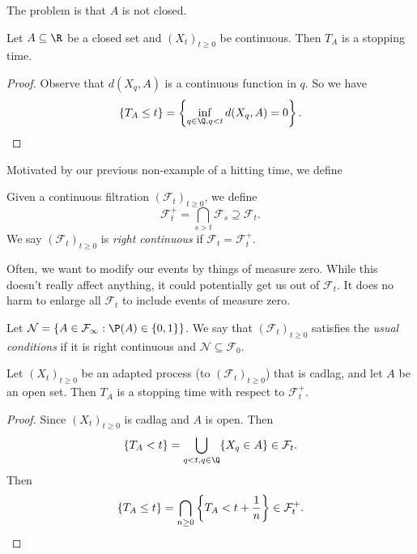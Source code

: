 \documentclass[a4paper]{article}
\begin{document}
The problem is that $A$ is not closed.

\begin{prop}
  Let $A \subseteq \R$ be a closed set and $(X_t)_{t \geq 0}$ be continuous. Then $T_A$ is a stopping time.
\end{prop}

\begin{proof}
  Observe that $d(X_q, A)$ is a continuous function in $q$. So we have
  \[
    \{T_A \leq t\} = \left\{\inf_{q \in \Q, q < t} d(X_q, A) = 0\right\}.\qedhere
  \]
\end{proof}

Motivated by our previous non-example of a hitting time, we define
\begin{defi}
  Given a continuous filtration $(\mathcal{F}_t)_{t \geq 0}$, we define
  \[
    \mathcal{F}_t^+ = \bigcap_{s > t} \mathcal{F}_s \supseteq \mathcal{F}_t.
  \]
  We say $(\mathcal{F}_t)_{t \geq 0}$ is \emph{right continuous} if $\mathcal{F}_t = \mathcal{F}_t^+$.
\end{defi}

Often, we want to modify our events by things of measure zero. While this doesn't really affect anything, it could potentially get us out of $\mathcal{F}_t$. It does no harm to enlarge all $\mathcal{F}_t$ to include events of measure zero.

\begin{defi}
  Let $\mathcal{N} = \{A \in \mathcal{F}_\infty : \P(A) \in \{0, 1\}\}$. We say that $(\mathcal{F}_t)_{t \geq 0}$ satisfies the \emph{usual conditions} if it is right continuous and $\mathcal{N} \subseteq \mathcal{F}_0$.
\end{defi}

\begin{prop}
  Let $(X_t)_{t \geq 0}$ be an adapted process (to $(\mathcal{F}_{t})_{t \geq 0}$) that is cadlag, and let $A$ be an open set. Then $T_A$ is a stopping time with respect to $\mathcal{F}_t^+$.
\end{prop}

\begin{proof}
  Since $(X_t)_{t \geq 0}$ is cadlag and $A$ is open. Then
  \[
    \{T_A < t\} = \bigcup_{q < t, q \in \Q} \{X_q \in A\} \in \mathcal{F}_t.
  \]
  Then
  \[
    \{T_A \leq t\} = \bigcap_{n \geq 0} \left\{T_A < t + \frac{1}{n}\right\} \in \mathcal{F}_t^+.\qedhere
  \]
\end{proof}
\end{document}
